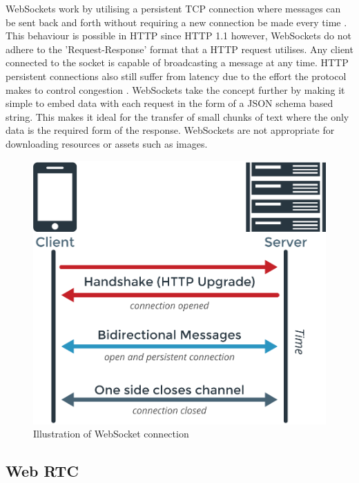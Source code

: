 WebSockets work by utilising a persistent TCP connection where messages can be sent back and forth without requiring a new connection be made every time \cite{wsrfc}. This behaviour is possible in HTTP since HTTP 1.1 however, WebSockets do not adhere to the 'Request-Response' format that a HTTP request utilises. Any client connected to the socket is capable of broadcasting a message at any time. HTTP persistent connections also still suffer from latency due to the effort the protocol makes to control congestion \cite{httpvsws}. WebSockets take the concept further by making it simple to embed data with each request in the form of a JSON schema based string. This makes it ideal for the transfer of small chunks of text where the only data is the required form of the response. WebSockets are not appropriate for downloading resources or assets such as images.

\begin{figure}[h!]
    \centering
    \includegraphics[scale=0.3]{res/WebSockets-Diagram.png}
    \caption{Illustration of WebSocket connection \cite{websocket-img}}
    \label{}
\end{figure}

\subsection{Web RTC}

